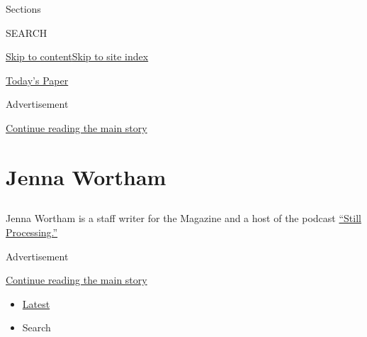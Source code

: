 Sections

SEARCH

\protect\hyperlink{site-content}{Skip to
content}\protect\hyperlink{site-index}{Skip to site index}

\href{https://myaccount.nytimes3xbfgragh.onion/auth/login?response_type=cookie\&client_id=vi}{}

\href{https://www.nytimes3xbfgragh.onion/section/todayspaper}{Today's
Paper}

Advertisement

\protect\hyperlink{after-top}{Continue reading the main story}

\hypertarget{jenna-wortham}{%
\section{Jenna Wortham}\label{jenna-wortham}}

\subsection{}

Jenna Wortham is a staff writer for the Magazine and a host of the
podcast
\href{https://www.nytimes3xbfgragh.onion/podcasts/still-processing}{``Still
Processing.''}

Advertisement

\protect\hyperlink{after-mid1}{Continue reading the main story}

\begin{itemize}
\tightlist
\item
  \protect\hyperlink{stream-panel}{Latest}
\item
  Search
\end{itemize}

